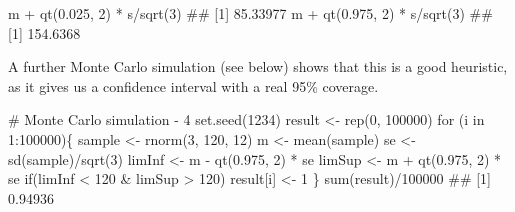 \documentclass[a4paper,12pt,oneside]{book}
\newenvironment{Shaded}{\begin{snugshade}}{\end{snugshade}}
\newcommand{\DecValTok}[1]{#1}
\newcommand{\FloatTok}[1]{#1}
\newcommand{\SpecialCharTok}[1]{#1}
\newcommand{\CommentTok}[1]{#1}
\newcommand{\DocumentationTok}[1]{#1}
\newcommand{\OtherTok}[1]{#1}
\newcommand{\FunctionTok}[1]{#1}
\newcommand{\ControlFlowTok}[1]{#1}
\newcommand{\NormalTok}[1]{#1}
\begin{document}
\begin{Shaded}
\begin{Highlighting}[]
\NormalTok{m }\SpecialCharTok{+} \FunctionTok{qt}\NormalTok{(}\FloatTok{0.025}\NormalTok{, }\DecValTok{2}\NormalTok{) }\SpecialCharTok{*}\NormalTok{ s}\SpecialCharTok{/}\FunctionTok{sqrt}\NormalTok{(}\DecValTok{3}\NormalTok{)}
\DocumentationTok{\#\# [1] 85.33977}
\NormalTok{m }\SpecialCharTok{+} \FunctionTok{qt}\NormalTok{(}\FloatTok{0.975}\NormalTok{, }\DecValTok{2}\NormalTok{) }\SpecialCharTok{*}\NormalTok{ s}\SpecialCharTok{/}\FunctionTok{sqrt}\NormalTok{(}\DecValTok{3}\NormalTok{)}
\DocumentationTok{\#\# [1] 154.6368}
\end{Highlighting}
\end{Shaded}

A further Monte Carlo simulation (see below) shows that this is a good heuristic, as it gives us a confidence interval with a real 95\% coverage.

\begin{Shaded}
\begin{Highlighting}[]
\CommentTok{\# Monte Carlo simulation {-} 4}
\FunctionTok{set.seed}\NormalTok{(}\DecValTok{1234}\NormalTok{)}
\NormalTok{result }\OtherTok{\textless{}{-}} \FunctionTok{rep}\NormalTok{(}\DecValTok{0}\NormalTok{, }\DecValTok{100000}\NormalTok{)}
\ControlFlowTok{for}\NormalTok{ (i }\ControlFlowTok{in} \DecValTok{1}\SpecialCharTok{:}\DecValTok{100000}\NormalTok{)\{}
\NormalTok{  sample }\OtherTok{\textless{}{-}} \FunctionTok{rnorm}\NormalTok{(}\DecValTok{3}\NormalTok{, }\DecValTok{120}\NormalTok{, }\DecValTok{12}\NormalTok{)}
\NormalTok{  m }\OtherTok{\textless{}{-}} \FunctionTok{mean}\NormalTok{(sample)}
\NormalTok{  se }\OtherTok{\textless{}{-}} \FunctionTok{sd}\NormalTok{(sample)}\SpecialCharTok{/}\FunctionTok{sqrt}\NormalTok{(}\DecValTok{3}\NormalTok{)}
\NormalTok{  limInf }\OtherTok{\textless{}{-}}\NormalTok{ m }\SpecialCharTok{{-}} \FunctionTok{qt}\NormalTok{(}\FloatTok{0.975}\NormalTok{, }\DecValTok{2}\NormalTok{) }\SpecialCharTok{*}\NormalTok{ se}
\NormalTok{  limSup }\OtherTok{\textless{}{-}}\NormalTok{ m }\SpecialCharTok{+} \FunctionTok{qt}\NormalTok{(}\FloatTok{0.975}\NormalTok{, }\DecValTok{2}\NormalTok{) }\SpecialCharTok{*}\NormalTok{ se}
  \ControlFlowTok{if}\NormalTok{(limInf }\SpecialCharTok{\textless{}} \DecValTok{120} \SpecialCharTok{\&}\NormalTok{ limSup }\SpecialCharTok{\textgreater{}} \DecValTok{120}\NormalTok{) result[i] }\OtherTok{\textless{}{-}} \DecValTok{1}
\NormalTok{\}}
\FunctionTok{sum}\NormalTok{(result)}\SpecialCharTok{/}\DecValTok{100000}
\DocumentationTok{\#\# [1] 0.94936}
\end{Highlighting}
\end{Shaded}
\end{document}
